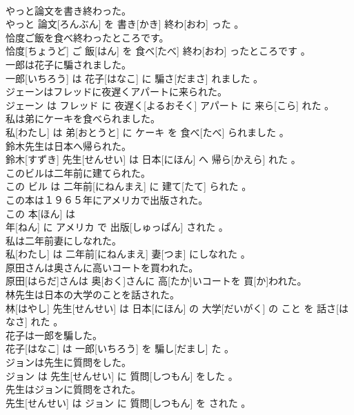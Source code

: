 \documentclass[8pt]{extreport}
\begin{document}
\begin{CJK}{UTF8}{min}
\\	やっと論文を書き終わった。	
\\	やっと 論文[ろんぶん] を 書き[かき] 終わ[おわ] った 。
\\	恰度ご飯を食べ終わったところです。	
\\	恰度[ちょうど] ご 飯[はん] を 食べ[たべ] 終わ[おわ] ったところです 。
\\	一郎は花子に騙されました。	
\\	一郎[いちろう] は 花子[はなこ] に 騙さ[だまさ] れました 。
\\	ジェーンはフレッドに夜遅くアパートに来られた。	
\\	ジェーン は フレッド に 夜遅く[よるおそく] アパート に 来ら[こら] れた 。
\\	私は弟にケーキを食べられました。	
\\	私[わたし] は 弟[おとうと] に ケーキ を 食べ[たべ] られました 。
\\	鈴木先生は日本へ帰られた。	
\\	鈴木[すずき] 先生[せんせい] は 日本[にほん] へ 帰ら[かえら] れた 。
\\	このビルは二年前に建てられた。	
\\	この ビル は 二年前[にねんまえ] に 建て[たて] られた 。
\\	この本は１９６５年にアメリカで出版された。	
\\	この 本[ほん] は 
\\	年[ねん] に アメリカ で 出版[しゅっぱん] された 。
\\	私は二年前妻にしなれた。	
\\	私[わたし] は 二年前[にねんまえ] 妻[つま] にしなれた 。
\\	原田さんは奥さんに高いコートを買われた。	
\\	原田[はらだ]さんは 奥[おく]さんに 高[たか]いコートを 買[か]われた。
\\	林先生は日本の大学のことを話された。	
\\	林[はやし] 先生[せんせい] は 日本[にほん] の 大学[だいがく] の こと を 話さ[はなさ] れた 。
\\	花子は一郎を騙した。	
\\	花子[はなこ] は 一郎[いちろう] を 騙し[だまし] た 。
\\	ジョンは先生に質問をした。	
\\	ジョン は 先生[せんせい] に 質問[しつもん] をした 。
\\	先生はジョンに質問をされた。	
\\	先生[せんせい] は ジョン に 質問[しつもん] を された 。

\end{CJK}
\end{document}
